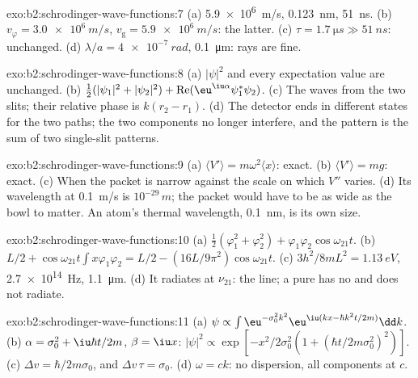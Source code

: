 \begin{solution}{exo:b2:schrodinger-wave-functions:7}
(a) \qty{5.9e6}{m/s}, \qty{0.123}{nm}, \qty{51}{ns}. (b) $v_\varphi = \qty{3.0e6}{m/s}$,
$v_{\text{g}} = \qty{5.9e6}{m/s}$: the latter. (c) $\tau = \qty{1.7}{\micro s} \gg
\qty{51}{ns}$: unchanged. (d) $\lambda/a = \qty{4e-7}{rad}$, \qty{0.1}{\micro m}:
rays are fine.
\end{solution}

\begin{solution}{exo:b2:schrodinger-wave-functions:8}
(a) $|\psi|^2$ and every expectation value are unchanged. (b) $\tfrac12(|\psi_1|^2
+ |\psi_2|^2) + \operatorname{Re}(\eu^{\iu\alpha}\psi_1^*\psi_2)$. (c) The waves from
the two slits; their relative phase is $k(r_2 - r_1)$. (d) The detector
ends in different states for the two paths; the two components no
longer interfere, and the pattern is the sum of two single-slit
patterns.
\end{solution}

\begin{solution}{exo:b2:schrodinger-wave-functions:9}
(a) $\langle V'\rangle = m\omega^2\langle x\rangle$: exact. (b) $\langle V'\rangle
= mg$: exact. (c) When the packet is narrow against the scale on which
$V''$ varies. (d) Its wavelength at \qty{0.1}{m/s} is $10^{-29}\,\unit{m}$; the
packet would have to be as wide as the bowl to matter. An atom's
thermal wavelength, \qty{0.1}{nm}, is its own size.
\end{solution}

\begin{solution}{exo:b2:schrodinger-wave-functions:10}
(a) $\tfrac12(\varphi_1^2 + \varphi_2^2) + \varphi_1\varphi_2\cos\omega_{21}t$. (b) $L/2 +
\cos\omega_{21}t\int x\varphi_1\varphi_2 = L/2 - (16L/9\pi^2)\cos\omega_{21}t$. (c)
$3h^2/8mL^2 = \qty{1.13}{eV}$, \qty{2.7e14}{Hz}, \qty{1.1}{\micro m}. (d) It radiates
at $\nu_{21}$: the line; a pure  has no  and does not radiate.
\end{solution}

\begin{solution}{exo:b2:schrodinger-wave-functions:11}
(a) $\psi \propto \int\eu^{-\sigma_0^2k^2}\eu^{\iu(kx - \hbar k^2t/2m)}\dd k$. (b) $\alpha =
\sigma_0^2 + \iu\hbar t/2m$, $\beta = \iu x$: $|\psi|^2 \propto \exp[-x^2/2\sigma_0^2(1 +
(\hbar t/2m\sigma_0^2)^2)]$. (c) $\Delta v = \hbar/2m\sigma_0$, and $\Delta v\,\tau =
\sigma_0$. (d) $\omega = ck$: no dispersion, all components at $c$.
\end{solution}

